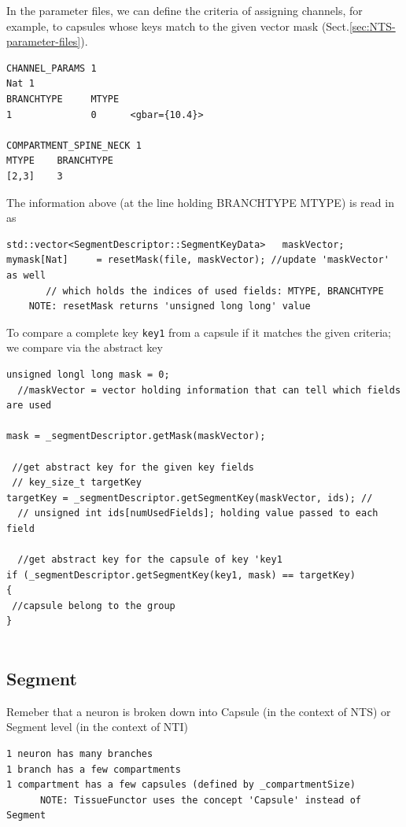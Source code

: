 In the parameter files, we can define the criteria of assigning channels, for
example, to capsules whose keys match to the given vector mask
(Sect.\ref{sec:NTS-parameter-files}).

\begin{verbatim}
CHANNEL_PARAMS 1
Nat 1
BRANCHTYPE     MTYPE
1              0      <gbar={10.4}>

COMPARTMENT_SPINE_NECK 1
MTYPE    BRANCHTYPE
[2,3]    3                
\end{verbatim}

The information above (at the line holding BRANCHTYPE MTYPE) is read in as
\begin{verbatim}
std::vector<SegmentDescriptor::SegmentKeyData>   maskVector;  
mymask[Nat]     = resetMask(file, maskVector); //update 'maskVector' as well
       // which holds the indices of used fields: MTYPE, BRANCHTYPE
    NOTE: resetMask returns 'unsigned long long' value
\end{verbatim}


To compare a complete key \verb!key1! from a capsule if it matches the given
criteria; we compare via the abstract key
\begin{verbatim}
unsigned longl long mask = 0;
  //maskVector = vector holding information that can tell which fields are used
  
mask = _segmentDescriptor.getMask(maskVector);

 //get abstract key for the given key fields
 // key_size_t targetKey
targetKey = _segmentDescriptor.getSegmentKey(maskVector, ids); // 
  // unsigned int ids[numUsedFields]; holding value passed to each field
  
  //get abstract key for the capsule of key 'key1
if (_segmentDescriptor.getSegmentKey(key1, mask) == targetKey)
{
 //capsule belong to the group
}  
  
\end{verbatim}

\subsection{Segment}
\label{sec:Segment}

Remeber that a neuron is broken down into Capsule (in the context of NTS) or
Segment level (in the context of NTI)

\begin{verbatim}
1 neuron has many branches
1 branch has a few compartments
1 compartment has a few capsules (defined by _compartmentSize)
      NOTE: TissueFunctor uses the concept 'Capsule' instead of Segment
\end{verbatim}

